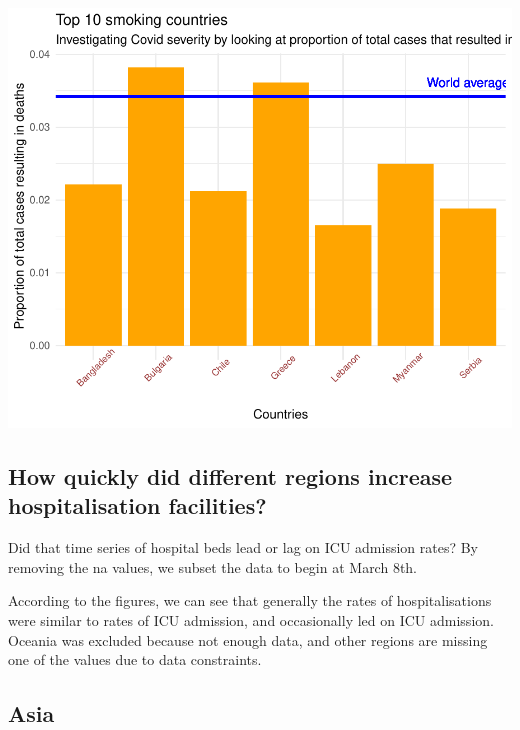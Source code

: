 \documentclass[11pt,preprint, authoryear]{elsarticle}
\numberwithin{equation}{section}
\numberwithin{figure}{section}
\numberwithin{table}{section}
\begin{document}
\includegraphics{Question1_files/figure-latex/unnamed-chunk-1-1.pdf}

\hypertarget{how-quickly-did-different-regions-increase-hospitalisation-facilities}{%
\subsection{How quickly did different regions increase hospitalisation
facilities?}\label{how-quickly-did-different-regions-increase-hospitalisation-facilities}}

Did that time series of hospital beds lead or lag on ICU admission
rates? By removing the na values, we subset the data to begin at March
8th.

According to the figures, we can see that generally the rates of
hospitalisations were similar to rates of ICU admission, and
occasionally led on ICU admission. Oceania was excluded because not
enough data, and other regions are missing one of the values due to data
constraints.

\hypertarget{asia}{%
\subsection{Asia}\label{asia}}
\end{document}
